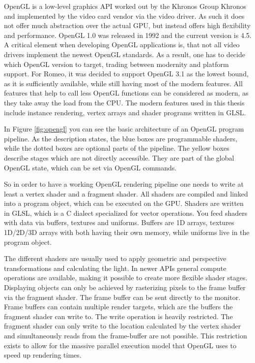 \ac{OpenGL} is a low-level graphics API worked out by the Khronos Group \ac{Khronos} and implemented by the video card vendor via the video driver. 
As such it does not offer much abstraction over the actual \ac{GPU}, but instead offers high flexibility and performance.
\ac{OpenGL} 1.0 was released in 1992 and the current version is 4.5.
A critical element when developing \ac{OpenGL} applications is, that not all video drivers implement the newest \ac{OpenGL} standards.
As a result, one has to decide which \ac{OpenGL} version to target, trading between modernity and platform support.
For Romeo, it was decided to support \ac{OpenGL} 3.1 as the lowest bound, as it is sufficiently available, while still having most of the modern features.
All features that help to call less OpenGL functions can be considered as modern, as they take away the load from the CPU.
The modern features used in this thesis include instance rendering, vertex arrays and shader programs written in \ac{GLSL}.

In Figure \ref{fig:opengl} you can see the basic architecture of an OpenGL program pipeline.
As the description states, the blue boxes are programmable shaders, while the dotted boxes are optional parts of the pipeline.
The yellow boxes describe stages which are not directly accessible. They are part of the global OpenGL state, which can be set via OpenGL commands.

So in order to have a working OpenGL rendering pipeline one needs to write at least a vertex shader and a fragment shader.
All shaders are compiled and linked into a program object, which can be executed on the \ac{GPU}.
Shaders are written in \ac{GLSL}, which is a C dialect specialized for vector operations.
You feed shaders with data via buffers, textures and uniforms. Buffers are 1D arrays, textures 1D/2D/3D arrays with both having their own memory, while uniforms live in the program object.

The different shaders are usually used to apply geometric and perspective transformations and calculating the light.
In newer APIs general compute operations are available, making it possible to create more flexible shader stages.
Displaying objects can only be achieved by rasterizing pixels to the frame buffer via the fragment shader.
The frame buffer can be sent directly to the monitor.
Frame buffers can contain multiple render targets, which are the buffers the fragment shader can write to.
The write operation is heavily restricted. The fragment shader can only write to the location calculated by the vertex shader and simultaneously reads from the frame-buffer are not possible. 
This restriction exists to allow for the massive parallel execution model that OpenGL uses to speed up rendering times.

